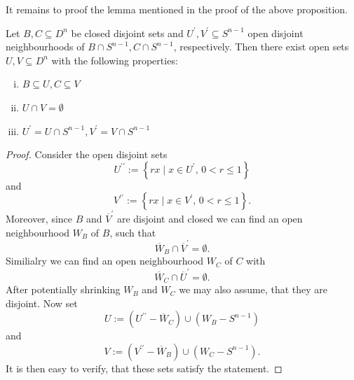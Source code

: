 It remains to proof the lemma mentioned in the proof of the above proposition.

\begin{lemma}
    \label{lem:technical_lemma1}
    Let $B , C \subseteq D^n$ be closed disjoint sets and $U^\prime, V^\prime \subseteq S^{n-1}$ open disjoint neighbourhoods of $B \cap S^{n-1}, C \cap S^{n-1}$, respectively. Then there exist open sets $U,V \subseteq D^n$ with the following properties:
    \begin{enumerate}[(i)]
        \item $B \subseteq U, C \subseteq V$
        \item $U \cap V =\emptyset$
        \item $U^\prime = U \cap S^{n-1}, V^\prime = V \cap S^{n-1}$
    \end{enumerate}
\end{lemma}

\begin{proof}
    Consider the open disjoint sets
    \[
        U^{\prime\prime} := \left\{ rx \mid x \in U^\prime,\, 0<r\leq 1\right\}
    \]
    and
    \[
        V^{\prime\prime} := \left\{ rx \mid x \in V^\prime,\, 0<r\leq 1\right\}.
    \]
    Moreover, since $B$ and $\overline{V}^\prime$ are disjoint and closed we can find an open neighbourhood $W_B$ of $B$, such that 
    \[
    \overline{W}_B \cap \overline{V}^\prime = \emptyset.
    \]
    Similialry we can find an open neighbourhood $W_C$ of $C$ with 
    \[
        \overline{W}_C \cap \overline{U}^\prime = \emptyset.
    \]
    After potentially shrinking $W_B$ and $W_C$ we may also assume, that they are disjoint. Now set 
    \[
        U := (U^{\prime\prime} - \overline{W}_C) \cup (W_B - S^{n-1})
    \]
    and 
    \[
        V := (V^{\prime\prime} - \overline{W}_B) \cup (W_C - S^{n-1}).
    \]
    It is then easy to verify, that these sets satisfy the statement.
\end{proof}